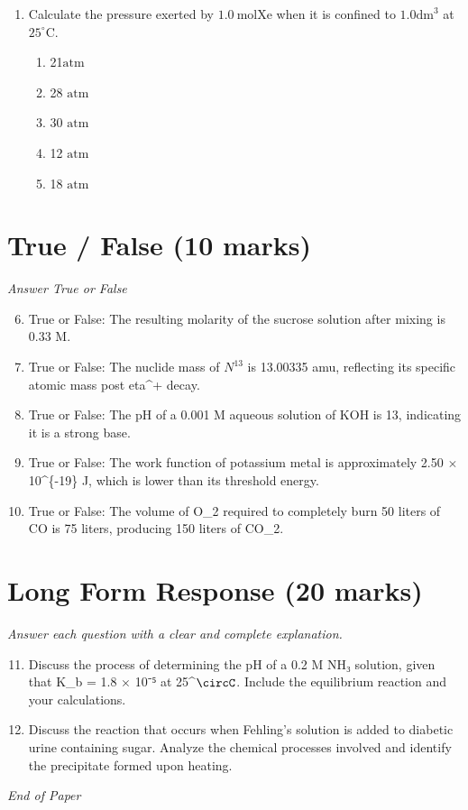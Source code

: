 \documentclass[12pt]{article}
\begin{document}
\begin{enumerate}[label=\arabic*.]
\begin{enumerate}[label=(\alph*)]
    \item -5/3, 4/2
    \item 5/3, -4/2
    \item 2, -10
    \item 4, -5
\end{enumerate}
\item Calculate the pressure exerted by $1.0 \mathrm{~mol} \mathrm{Xe}$ when it is confined to $1.0 \mathrm{dm}^3$ at $25^{\circ} \mathrm{C}$.
\begin{enumerate}[label=(\alph*)]
    \item 21$\mathrm{atm}$
    \item 28 $\mathrm{atm}$
    \item 30 $\mathrm{atm}$
    \item 12 $\mathrm{atm}$
    \item 18 $\mathrm{atm}$
\end{enumerate}
\end{enumerate}

\section*{True / False (10 marks)}
\textit{Answer True or False}
\begin{enumerate}[label=\arabic*.]
\setcounter{enumi}{5}
\item True or False: The resulting molarity of the sucrose solution after mixing is 0.33 M.
\item True or False: The nuclide mass of $N^13$ is 13.00335 amu, reflecting its specific atomic mass post eta^+ decay.
\item True or False: The pH of a 0.001 M aqueous solution of KOH is 13, indicating it is a strong base.
\item True or False: The work function of potassium metal is approximately 2.50 \ensuremath{\times} 10^\{-19\} J, which is lower than its threshold energy.
\item True or False: The volume of O\_2 required to completely burn 50 liters of CO is 75 liters, producing 150 liters of CO\_2.
\end{enumerate}

\section*{Long Form Response (20 marks)}
\textit{Answer each question with a clear and complete explanation.}
\begin{enumerate}[label=\arabic*.]
\setcounter{enumi}{10}
\item Discuss the process of determining the pH of a 0.2 M NH₃ solution, given that K\_b = 1.8 \ensuremath{\times} 10⁻⁵ at 25^\ensuremath{\circC}. Include the equilibrium reaction and your calculations.
\item Discuss the reaction that occurs when Fehling's solution is added to diabetic urine containing sugar. Analyze the chemical processes involved and identify the precipitate formed upon heating.
\end{enumerate}

\vfill
\noindent\textit{End of Paper}
\end{document}
